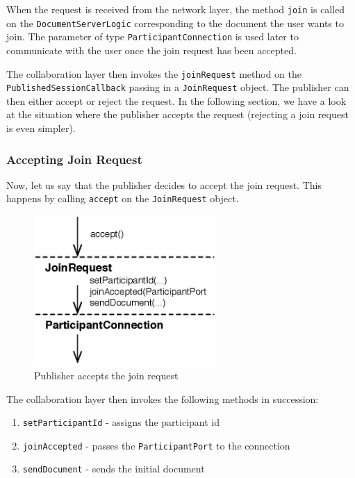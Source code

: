 When the request is received from the network layer, the method
\texttt{join} is called on the \texttt{Document\-Server\-Logic} corresponding
to the document the user wants to join. The parameter of type 
\texttt{Participant\-Connection} is used later to communicate with the user
once the join request has been accepted.

The collaboration layer then invokes the \texttt{join\-Request} method on
the \texttt{Published\-Session\-Callback} passing in a \texttt{Join\-Request}
object. The publisher can then either accept or 
reject the request. In the following section, we have a look at the
situation where the publisher accepts the request (rejecting a join
request is even simpler).

\subsubsection{Accepting Join Request}
Now, let us say that the publisher decides
to accept the join request. This happens by calling \texttt{accept} on the
\texttt{Join\-Request} object.

\begin{figure}[H]
 \centering
 \includegraphics[width=6.91cm,height=5.72cm]{../images/finalreport/architecture_flows/join_request_accept.eps}
 \caption{Publisher accepts the join request}
 \label{fig:archoverview.flow.joinrequestaccept}
\end{figure}

The collaboration layer then invokes the following methods in succession:
\begin{enumerate}
 \item \texttt{setParticipantId} - assigns the participant id
 \item \texttt{joinAccepted} - passes the \texttt{ParticipantPort} to the connection
 \item \texttt{sendDocument} - sends the initial document
\end{enumerate}

